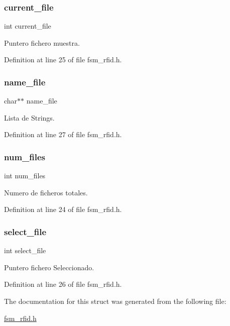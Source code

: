 \subsubsection{\texorpdfstring{current\+\_\+file}{current\_file}}
{\footnotesize\ttfamily int current\+\_\+file}



Puntero fichero muestra. 



Definition at line 25 of file fsm\+\_\+rfid.\+h.

\mbox{\label{structlist__files_ac683a830b7c1fd9d1fdee795b2b5e8a0}} 
\subsubsection{\texorpdfstring{name\+\_\+file}{name\_file}}
{\footnotesize\ttfamily char$\ast$$\ast$ name\+\_\+file}



Lista de Strings. 



Definition at line 27 of file fsm\+\_\+rfid.\+h.

\mbox{\label{structlist__files_a70fbdb4ac81ecb8a257691170b40f4bb}} 
\subsubsection{\texorpdfstring{num\+\_\+files}{num\_files}}
{\footnotesize\ttfamily int num\+\_\+files}



Numero de ficheros totales. 



Definition at line 24 of file fsm\+\_\+rfid.\+h.

\mbox{\label{structlist__files_ab8e9545f9cf8e60731a881b07d37a134}} 
\subsubsection{\texorpdfstring{select\+\_\+file}{select\_file}}
{\footnotesize\ttfamily int select\+\_\+file}



Puntero fichero Seleccionado. 



Definition at line 26 of file fsm\+\_\+rfid.\+h.



The documentation for this struct was generated from the following file\+:\begin{DoxyCompactItemize}
\item 
\mbox{\hyperlink{fsm__rfid_8h}{fsm\+\_\+rfid.\+h}}\end{DoxyCompactItemize}
